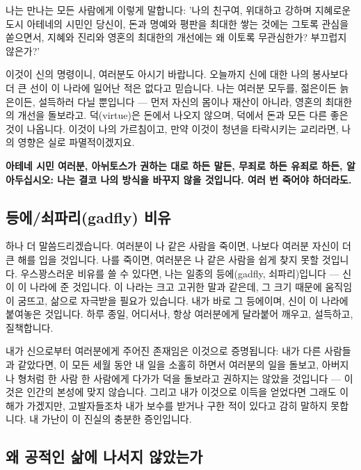 \documentclass[11pt, a4paper]{article}
\begin{document}
나는 만나는 모든 사람에게 이렇게 말합니다: '나의 친구여, 위대하고 강하며 지혜로운 도시 아테네의 시민인 당신이, 돈과 명예와 평판을 최대한 쌓는 것에는 그토록 관심을 쏟으면서, 지혜와 진리와 영혼의 최대한의 개선에는 왜 이토록 무관심한가? 부끄럽지 않은가?'


이것이 신의 명령이니, 여러분도 아시기 바랍니다. 오늘까지 신에 대한 나의 봉사보다 더 큰 선이 이 나라에 일어난 적은 없다고 믿습니다. 나는 여러분 모두를, 젊은이든 늙은이든, 설득하러 다닐 뿐입니다 — 먼저 자신의 몸이나 재산이 아니라, 영혼의 최대한의 개선을 돌보라고. 덕(virtue)은 돈에서 나오지 않으며, 덕에서 돈과 모든 다른 좋은 것이 나옵니다. 이것이 나의 가르침이고, 만약 이것이 청년을 타락시키는 교리라면, 나의 영향은 실로 파멸적이겠지요.


\textbf{아테네 시민 여러분, 아뉘토스가 권하는 대로 하든 말든, 무죄로 하든 유죄로 하든, 알아두십시오: 나는 결코 나의 방식을 바꾸지 않을 것입니다. 여러 번 죽어야 하더라도.}


\bigskip


\subsection{등에/쇠파리(gadfly) 비유}


하나 더 말씀드리겠습니다. 여러분이 나 같은 사람을 죽이면, 나보다 여러분 자신이 더 큰 해를 입을 것입니다. 나를 죽이면, 여러분은 나 같은 사람을 쉽게 찾지 못할 것입니다. 우스꽝스러운 비유를 쓸 수 있다면, 나는 일종의 등에(gadfly, 쇠파리)입니다 — 신이 이 나라에 준 것입니다. 이 나라는 크고 고귀한 말과 같은데, 그 크기 때문에 움직임이 굼뜨고, 삶으로 자극받을 필요가 있습니다. 내가 바로 그 등에이며, 신이 이 나라에 붙여놓은 것입니다. 하루 종일, 어디서나, 항상 여러분에게 달라붙어 깨우고, 설득하고, 질책합니다.


내가 신으로부터 여러분에게 주어진 존재임은 이것으로 증명됩니다: 내가 다른 사람들과 같았다면, 이 모든 세월 동안 내 일을 소홀히 하면서 여러분의 일을 돌보고, 아버지나 형처럼 한 사람 한 사람에게 다가가 덕을 돌보라고 권하지는 않았을 것입니다 — 이것은 인간의 본성에 맞지 않습니다. 그리고 내가 이것으로 이득을 얻었다면 그래도 이해가 가겠지만, 고발자들조차 내가 보수를 받거나 구한 적이 있다고 감히 말하지 못합니다. 내 가난이 이 진실의 충분한 증인입니다.


\bigskip


\subsection{왜 공적인 삶에 나서지 않았는가}
\end{document}
